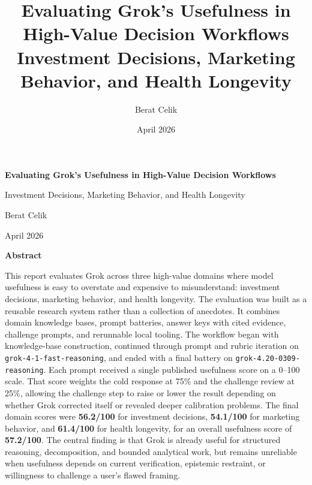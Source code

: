 \documentclass[11pt, a4paper]{article}
\title{
    \vspace{-1cm}
    \textbf{Evaluating Grok's Usefulness in High-Value Decision Workflows} \\
    \large Investment Decisions, Marketing Behavior, and Health Longevity
}
\author{Berat Celik}
\date{April 2026}
\begin{document}
\begin{titlepage}
\thispagestyle{empty}

\begin{center}
\vspace*{0.12\textheight}
{\LARGE\bfseries Evaluating Grok's Usefulness in High-Value Decision Workflows\par}
\vspace{0.6em}
{\large Investment Decisions, Marketing Behavior, and Health Longevity\par}
\vspace{2.2em}
{\large Berat Celik\par}
\vspace{0.5em}
{\normalsize April 2026\par}
\end{center}

\vfill

\begin{center}
\begin{minipage}{0.84\textwidth}
\begin{center}
\textbf{Abstract}
\end{center}
\small
This report evaluates Grok across three high-value domains where model usefulness is easy to overstate and expensive to misunderstand: investment decisions, marketing behavior, and health longevity. The evaluation was built as a reusable research system rather than a collection of anecdotes. It combines domain knowledge bases, prompt batteries, answer keys with cited evidence, challenge prompts, and rerunnable local tooling. The workflow began with knowledge-base construction, continued through prompt and rubric iteration on \texttt{grok-4-1-fast-reasoning}, and ended with a final battery on \texttt{grok-4.20-0309-reasoning}. Each prompt received a single published usefulness score on a 0--100 scale. That score weights the cold response at 75\% and the challenge review at 25\%, allowing the challenge step to raise or lower the result depending on whether Grok corrected itself or revealed deeper calibration problems. The final domain scores were \textbf{56.2/100} for investment decisions, \textbf{54.1/100} for marketing behavior, and \textbf{61.4/100} for health longevity, for an overall usefulness score of \textbf{57.2/100}. The central finding is that Grok is already useful for structured reasoning, decomposition, and bounded analytical work, but remains unreliable when usefulness depends on current verification, epistemic restraint, or willingness to challenge a user's flawed framing.
\end{minipage}
\end{center}

\vspace*{0.08\textheight}
\end{titlepage}
\clearpage
\begingroup
\small
\tableofcontents
\endgroup
\clearpage
\setcounter{page}{1}
\end{document}
